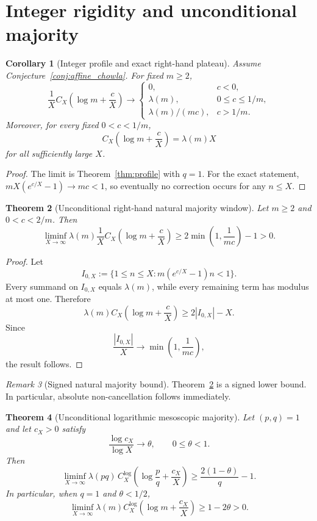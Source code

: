 \documentclass[preprint,12pt]{elsarticle}
\numberwithin{equation}{section}
\theoremstyle{plain}
\newtheorem{theorem}{Theorem}[section]
\newtheorem{corollary}[theorem]{Corollary}
\theoremstyle{definition}
\theoremstyle{remark}
\newtheorem{remark}[theorem]{Remark}
\begin{document}
\section{Integer rigidity and unconditional majority}
\label{sec:integer}

\begin{corollary}[Integer profile and exact right-hand plateau]
\label{cor:integer}
Assume Conjecture~\ref{conj:affine_chowla}. For fixed $m\ge2$,
\[
\frac1X C_X\!\left(\log m+\frac cX\right)
\longrightarrow
\begin{cases}
0,&c<0,\\
\lambda(m),&0\le c\le1/m,\\
\lambda(m)/(mc),&c>1/m.
\end{cases}
\]
Moreover, for every fixed $0<c<1/m$,
\[
C_X\!\left(\log m+\frac cX\right)=\lambda(m)X
\]
for all sufficiently large $X$.
\end{corollary}

\begin{proof}
The limit is Theorem~\ref{thm:profile} with $q=1$. For the exact statement,
$mX(e^{c/X}-1)\to mc<1$, so eventually no correction occurs for any
$n\le X$.
\end{proof}

\begin{theorem}[Unconditional right-hand natural majority window]
\label{thm:naturalmajority}
Let $m\ge2$ and $0<c<2/m$. Then
\begin{equation}
\liminf_{X\to\infty}
\lambda(m)\frac1X
C_X\!\left(\log m+\frac cX\right)
\ge
2\min\!\left(1,\frac1{mc}\right)-1>0.
\label{eq:naturalmajority}
\end{equation}
\end{theorem}

\begin{proof}
Let
\[
I_{0,X}:=\{1\le n\le X:m(e^{c/X}-1)n<1\}.
\]
Every summand on $I_{0,X}$ equals $\lambda(m)$, while every remaining term
has modulus at most one. Therefore
\[
\lambda(m)C_X\!\left(\log m+\frac cX\right)\ge2|I_{0,X}|-X.
\]
Since
\[
\frac{|I_{0,X}|}{X}\to\min\!\left(1,\frac1{mc}\right),
\]
the result follows.
\end{proof}

\begin{remark}[Signed natural majority bound]
Theorem~\ref{thm:naturalmajority} is a signed lower bound. In particular,
absolute non-cancellation follows immediately.
\end{remark}

\begin{theorem}[Unconditional logarithmic mesoscopic majority]
\label{thm:logmajority}
Let $(p,q)=1$ and let $c_X>0$ satisfy
\[
\frac{\log c_X}{\log X}\longrightarrow\theta,
\qquad 0\le\theta<1.
\]
Then
\begin{equation}
\liminf_{X\to\infty}
\lambda(pq)\,
C_X^{\log}\!\left(\log\frac pq+\frac{c_X}{X}\right)
\ge
\frac{2(1-\theta)}q-1.
\label{eq:logmajority}
\end{equation}
In particular, when $q=1$ and $\theta<1/2$,
\[
\liminf_{X\to\infty}
\lambda(m)C_X^{\log}\!\left(\log m+\frac{c_X}{X}\right)
\ge1-2\theta>0.
\]
\end{theorem}
\end{document}
